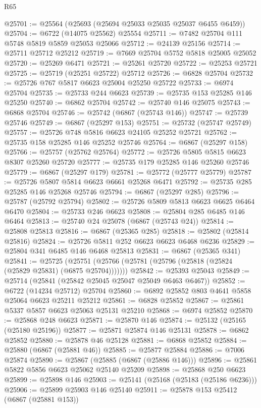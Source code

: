 \begin{lexlean}{R65}
\begin{coremodule}
{@25701 := @25564 (@25693 (@25694 @25033 @25035 @25037 @6455 @6459))
@25704 := @6722 (@14075 @25562) @25554
@25711 := @7482 @25704 @111 @5748 @5819 @5859 @25053 @25066
@25712 := @24139 @25156
@25714 := @25711 @25712 @25212
@25719 := @7669 @25704 @5752 @5818 @25005 @25052
@25720 := @25269 @6471
@25721 := @25261 @25720
@25722 := @25253 @25721
@25725 := @25719 (@25251 @25722) @25712
@25726 := @6828 @25704
@25732 := @25726 @767 @5817 @6623 @25004 @25250 @25722
@25733 := @6974 @25704
@25735 := @25733 @244 @6623
@25739 := @25735 @153 @25285 @146 @25250
@25740 := @6862 @25704
@25742 := @25740 @146 @25075
@25743 := @6868 @25704
@25746 := @25742 (@6867 (@25743 @146))
@25747 := @25739 @25746
@25749 := @6867 (@25297 @153)
@25751 := @25732 (@25747 @25749)
@25757 := @25726 @748 @5816 @6623 @24105 @25252 @25721
@25762 := @25735 @158 @25285 @146 @25252 @25746
@25764 := @6867 (@25297 @158)
@25766 := @25757 (@25762 @25764)
@25772 := @25726 @5805 @5815 @6623 @8307 @25260 @25720
@25777 := @25735 @179 @25285 @146 @25260 @25746
@25779 := @6867 (@25297 @179)
@25781 := @25772 (@25777 @25779)
@25787 := @25726 @5807 @5814 @6623 @6661 @25268 @6471
@25792 := @25735 @285 @25285 @146 @25268 @25746
@25794 := @6867 (@25297 @285)
@25796 := @25787 (@25792 @25794)
@25802 := @25726 @5809 @5813 @6623 @6625 @6464 @6470
@25804 := @25733 @246 @6623
@25808 := @25804 @285 @6485 @146 @6464
@25813 := @25740 @24 @25078 (@6867 (@25743 @24))
@25814 := @25808 @25813
@25816 := @6867 (@25365 @285)
@25818 := @25802 (@25814 @25816)
@25824 := @25726 @5811 @252 @6623 @6623 @6468 @6236
@25829 := @25804 @341 @6485 @146 @6468 @25813
@25831 := @6867 (@25365 @341)
@25841 := @25725
    (@25751 (@25766 (@25781 (@25796 (@25818 (@25824 (@25829 @25831) (@6875 @25704)))))))
@25842 := @25393 @25043
@25849 := @25714 (@25841 (@25842 @25045 @25047 @25049 @6463 @6467))
@25852 := @6722 (@14234 @25712) @25704
@25860 := @6892 @25852 @803 @4641 @5858 @25064 @6623 @25211 @25212
@25861 := @6828 @25852
@25867 := @25861 @5337 @5857 @6623 @25063 @25131 @25210
@25868 := @6974 @25852
@25870 := @25868 @248 @6623
@25871 := @25870 @146
@25874 := @25132 (@25165 (@25180 @25196))
@25877 := @25871 @25874 @146 @25131
@25878 := @6862 @25852
@25880 := @25878 @46 @25128
@25881 := @6868 @25852
@25884 := @25880 (@6867 (@25881 @46))
@25885 := @25877 @25884
@25886 := @7006 @25874
@25890 := @25867 (@25885 (@6867 (@25886 @146)))
@25896 := @25861 @5822 @5856 @6623 @25062 @25140 @25209
@25898 := @25868 @250 @6623
@25899 := @25898 @146
@25903 := @25141 (@25168 (@25183 (@25186 @6236)))
@25906 := @25899 @25903 @146 @25140
@25911 := @25878 @153 @25412 (@6867 (@25881 @153))
}
\end{coremodule}
\end{lexlean}
